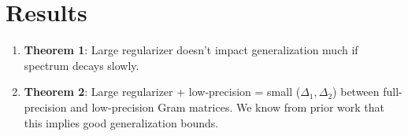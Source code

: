 \documentclass[12pt]{article}
\begin{document}
\section{Results}
\begin{enumerate}
	\item \textbf{Theorem 1}: Large regularizer doesn't impact generalization much if spectrum decays slowly.
	\item \textbf{Theorem 2}: Large regularizer + low-precision = small ($\Delta_1,\Delta_2$) between full-precision and low-precision Gram matrices.  We know from prior work that this implies good generalization bounds.
\end{enumerate}
\end{document}
